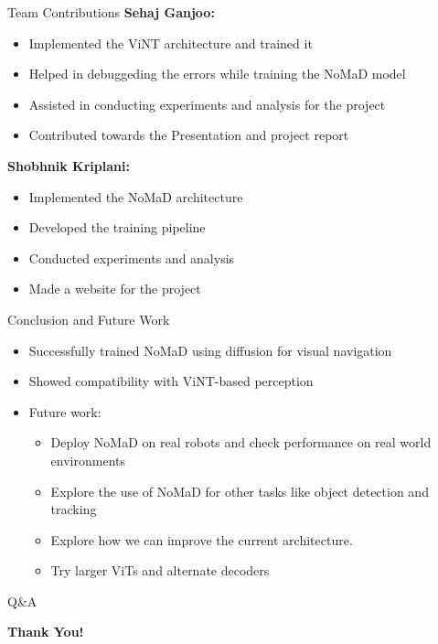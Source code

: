 \documentclass{beamer}
\begin{document}
\newpage

\begin{frame}{Team Contributions}
    \textbf{Sehaj Ganjoo:} \\
    \begin{itemize}
        \item Implemented the ViNT architecture and trained it
        \item Helped in debuggeding the errors while training the NoMaD model
        \item Assisted in conducting experiments and analysis for the project
        \item Contributed towards the Presentation and project report
    \end{itemize}
    \textbf{Shobhnik Kriplani:} \\
    \begin{itemize}
        \item Implemented the NoMaD architecture
        \item Developed the training pipeline
        \item Conducted experiments and analysis
        \item Made a website for the project

        
    \end{itemize}
\end{frame}

\begin{frame}{Conclusion and Future Work}
\begin{itemize}
    \item Successfully trained NoMaD using diffusion for visual navigation
    \item Showed compatibility with ViNT-based perception
    \item Future work:
    \begin{itemize}
        \item Deploy NoMaD on real robots and check performance on real world environments
        \item Explore the use of NoMaD for other tasks like object detection and tracking
        \item Explore how we can improve the current architecture.
        \item Try larger ViTs and alternate decoders
    \end{itemize}
\end{itemize}
\end{frame}

\begin{frame}{Q\&A}
    \begin{center}
        \Huge{\textbf{Thank You!}}\\
    \end{center}
\end{frame}
\end{document}
